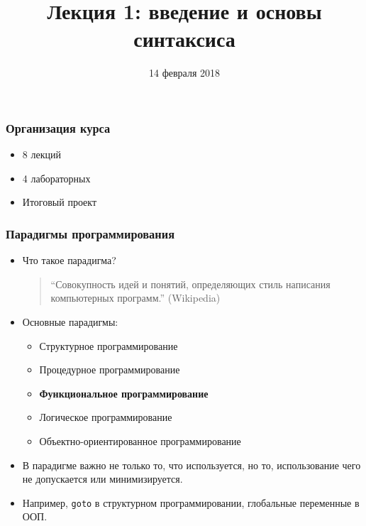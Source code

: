 \documentclass[10pt]{beamer}
\title{Лекция 1: введение и основы синтаксиса}
\date{14 февраля 2018}
\begin{document}
\begin{frame}[plain]
\maketitle
\end{frame}

\begin{frame}
\frametitle{Организация курса}
\begin{itemize}
    \item 8 лекций
    \item 4 лабораторных
    \item Итоговый проект
\end{itemize}
\end{frame}

\begin{frame}
\frametitle{Парадигмы программирования}
\begin{itemize}
\item Что такое парадигма?
\pause
\begin{quote}
\enquote{Совокупность идей и понятий, определяющих стиль написания компьютерных программ.} (Wikipedia)
\end{quote}
\pause
\item Основные парадигмы:
\pause
\begin{itemize}
    \item Структурное программирование
    \item Процедурное программирование
    \item \textbf{Функциональное программирование}
    \item Логическое программирование
    \item Объектно-ориентированное программирование
\end{itemize}
\pause
\item В парадигме важно не только то, что используется, но то, использование чего не допускается или минимизируется.
\pause
\item Например, \lstinline!goto! в структурном программировании, глобальные переменные в ООП.
\end{itemize}
\end{frame}
\end{document}
